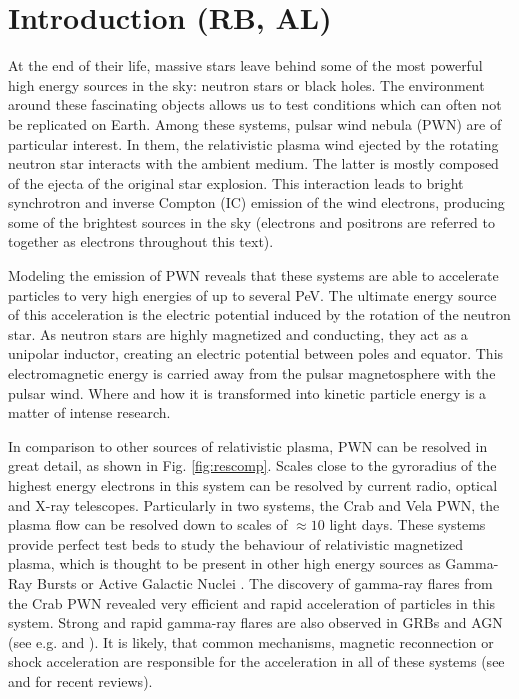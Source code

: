 \section{Introduction (RB, AL)}
At the end of their life, massive stars leave behind some of the most powerful high energy sources in the sky: neutron stars or black holes. The environment around these fascinating objects allows
us to test conditions which can often not be replicated on Earth. Among these systems, pulsar wind nebula (PWN) are of particular interest. In them, the relativistic plasma wind ejected by the rotating neutron star interacts with the ambient medium. The latter is mostly composed of the ejecta of the original star explosion. This interaction leads to bright synchrotron and inverse Compton (IC) emission of the wind electrons, producing some of the brightest sources in the sky (electrons and positrons are referred to together as electrons throughout this text).

Modeling the emission of PWN reveals that these systems are able to accelerate particles to very high energies of up to several PeV. The ultimate energy source of this acceleration is the electric potential induced by the rotation of the neutron star. As neutron stars are highly magnetized and conducting, they act as a unipolar inductor, creating an electric potential between poles and equator. This electromagnetic energy is carried away from the pulsar magnetosphere with the pulsar wind. Where and how it is transformed into kinetic particle energy is a matter of intense research.

In comparison to other sources of relativistic plasma, PWN can be resolved in great detail, as shown in Fig. \ref{fig:rescomp}. Scales close to the gyroradius of the highest energy electrons in this system can be resolved by current radio, optical and X-ray telescopes. Particularly in two systems, the Crab and Vela PWN, the plasma flow can be resolved down to scales of $\approx 10$ light days. These systems provide perfect test beds to study the behaviour of relativistic magnetized plasma, which is thought to be present in other high energy sources as Gamma-Ray Bursts or Active Galactic Nuclei \citep{Berger_2014,Massaro_2015}. The discovery of gamma-ray flares from the Crab PWN revealed very efficient and rapid acceleration of particles in this system. Strong and rapid gamma-ray flares are also observed in GRBs and AGN (see e.g. \citet{Ackermann_2013} and \citet{Aharonian_2009}). It is likely, that common mechanisms, magnetic reconnection or shock acceleration are responsible for the acceleration in all of these systems (see \citet{Kagan_2015} and \citet{Sironi_2015} for recent reviews).

